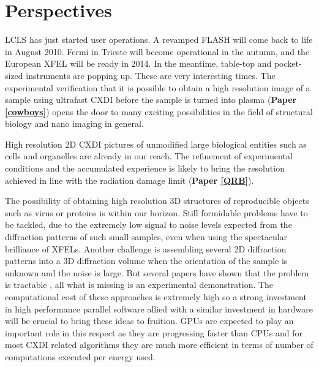 \chapter{Perspectives}\label{Future Perspectives}\noindent

LCLS has just started user operations. A revamped FLASH will come back to life
in August 2010. Fermi in Trieste will become operational in the autumn, and the
European XFEL will be ready in 2014. In the meantime, table-top and pocket-sized
instruments are popping up. These are very interesting times. The experimental
verification that it is possible to obtain a high resolution image of a sample
using ultrafast CXDI before the sample is turned into plasma ({\bf Paper
  \ref{cowboys}}) opens the door to many exciting possibilities in the field of
structural biology and nano imaging in general.

High resolution 2D CXDI pictures of unmodified large biological entities such as cells
and organelles are already in our reach. The refinement of experimental
conditions and the accumulated experience is likely to bring the resolution
achieved in line with the radiation damage limit ({\bf Paper
  \ref{QRB}}).

The possibility of obtaining high resolution 3D structures of reproducible
objects such as virus or proteins is within our horizon. Still formidable
problems have to be tackled, due to the extremely low signal to noise levels
expected from the diffraction patterns of such small samples, even when using
the spectacular brilliance of XFELs. Another challenge is assembling
several 2D diffraction patterns into a 3D diffraction volume when the
orientation of the sample is unknown and the noise is large. But several papers
have shown that the problem is tractable
\cite{Elser2009Noise,NeTeDuaneLoh2009Reconstruction,Fung2008Structure}, all 
what is missing is an experimental demonstration. The computational cost of
these approaches is extremely high so a strong investment in high
performance parallel software allied with a similar investment in hardware will
be crucial to bring these ideas to fruition. GPUs are expected to play an
important role in this respect as they are progressing faster than CPUs and for
most CXDI related algorithms they are much more efficient in terms of number of 
computations executed per energy used.

